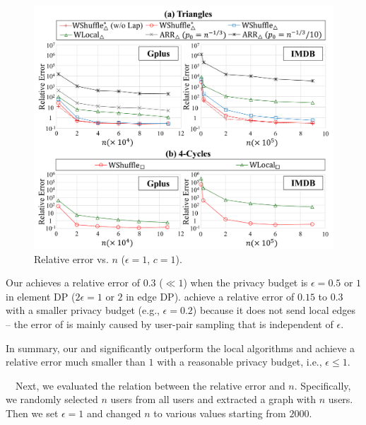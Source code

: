 \begin{figure}[t]
  \centering
  \includegraphics[width=0.99\linewidth]{fig/res2_n.pdf}
  
  \caption[Relative error vs. $n$.]{Relative error vs. $n$ ($\epsilon=1$, $c=1$).
  }
  \label{chap3-fig:res2_n}
\end{figure}

Our \AlgWSTriVR{} achieves a relative error of $0.3$ ($\ll 1$) 
when the privacy budget is $\epsilon = 0.5$ or $1$ in element DP ($2\epsilon = 1$ or $2$ in edge DP). 
\AlgWSCyc{} achieve a relative error of $0.15$ to $0.3$ with a smaller privacy budget (e.g., $\epsilon = 0.2$) because it  does not send local edges -- the error of \AlgWSCyc{} is mainly caused by user-pair sampling that is independent of $\epsilon$. 

In summary, our \AlgWSTriVR{} and \AlgWSCyc{} significantly outperform the local algorithms and achieve a relative error much smaller than $1$ with a reasonable privacy budget, i.e., $\epsilon \leq 1$. 

\smallskip
{}~~Next, we evaluated the relation between the relative error and $n$. 
Specifically, we randomly selected $n$ users from all users and extracted a graph with $n$ users. 
Then we set $\epsilon = 1$ and changed $n$ to various values starting from $2000$. 

